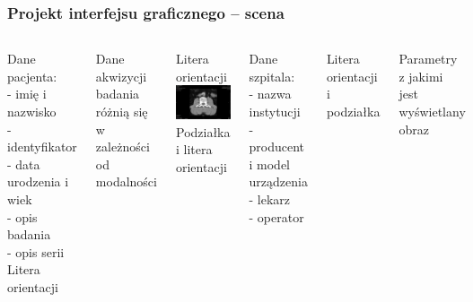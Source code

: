 \documentclass[aspectratio=169]{beamer}
\begin{document}
\begin{frame}
    \frametitle{Projekt interfejsu graficznego -- scena}
    \tiny
    \begin{columns}[t]


        Dane pacjenta:\\
        - imię i nazwisko\\
        - identyfikator\\
        - data urodzenia i wiek\\
        - opis badania\\
        - opis serii\\

        \vspace{8em}
        Litera orientacji

        \vspace{10em}
        Dane akwizycji badania\\
        różnią się w zależności od modalności


        \centering
        Litera orientacji
        \includegraphics[width=\textwidth]{img/sokar-gui-003.png}
        Podziałka i litera orientacji


        Dane szpitala:\\
        - nazwa instytucji\\
        - producent i model urządzenia\\
        - lekarz\\
        - operator

        \vspace{7em}
        Litera orientacji i podziałka

        \vspace{11em}
        Parametry z jakimi jest wyświetlany obraz

    \end{columns}
\end{frame}
\end{document}
